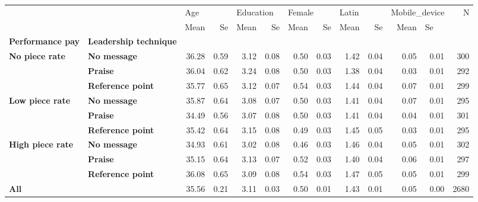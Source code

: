 \begin{tabular}{llrrrrrrrrrrr}
\toprule
    &                 & \multicolumn{2}{l}{Age} & \multicolumn{2}{l}{Education} & \multicolumn{2}{l}{Female} & \multicolumn{2}{l}{Latin} & \multicolumn{2}{l}{Mobile\_device} &     N \\
    &                 &  Mean &   Se &      Mean &   Se &   Mean &   Se &  Mean &   Se &          Mean & \multicolumn{2}{l}{Se} \\
\textbf{Performance pay} & \textbf{Leadership technique} &       &      &           &      &        &      &       &      &               &      &       \\
\midrule
\textbf{No piece rate} & \textbf{No message} & 36.28 & 0.59 &      3.12 & 0.08 &   0.50 & 0.03 &  1.42 & 0.04 &          0.05 & 0.01 &   300 \\
    & \textbf{Praise} & 36.04 & 0.62 &      3.24 & 0.08 &   0.50 & 0.03 &  1.38 & 0.04 &          0.03 & 0.01 &   292 \\
    & \textbf{Reference point} & 35.77 & 0.65 &      3.12 & 0.07 &   0.54 & 0.03 &  1.44 & 0.04 &          0.07 & 0.01 &   299 \\
\textbf{Low piece rate} & \textbf{No message} & 35.87 & 0.64 &      3.08 & 0.07 &   0.50 & 0.03 &  1.41 & 0.04 &          0.07 & 0.01 &   295 \\
    & \textbf{Praise} & 34.49 & 0.56 &      3.07 & 0.08 &   0.50 & 0.03 &  1.41 & 0.04 &          0.04 & 0.01 &   301 \\
    & \textbf{Reference point} & 35.42 & 0.64 &      3.15 & 0.08 &   0.49 & 0.03 &  1.45 & 0.05 &          0.03 & 0.01 &   295 \\
\textbf{High piece rate} & \textbf{No message} & 34.93 & 0.61 &      3.02 & 0.08 &   0.46 & 0.03 &  1.46 & 0.04 &          0.05 & 0.01 &   302 \\
    & \textbf{Praise} & 35.15 & 0.64 &      3.13 & 0.07 &   0.52 & 0.03 &  1.40 & 0.04 &          0.06 & 0.01 &   297 \\
    & \textbf{Reference point} & 36.08 & 0.65 &      3.09 & 0.08 &   0.54 & 0.03 &  1.47 & 0.05 &          0.05 & 0.01 &   299 \\
\textbf{All} &                 & 35.56 & 0.21 &      3.11 & 0.03 &   0.50 & 0.01 &  1.43 & 0.01 &          0.05 & 0.00 &  2680 \\
\bottomrule
\end{tabular}
